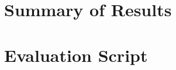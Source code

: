 \begin{appendices}

\chapter{Summary of Results}\label{A:summary}

\chapter{Evaluation Script}\label{A:eval}

\end{appendices}
